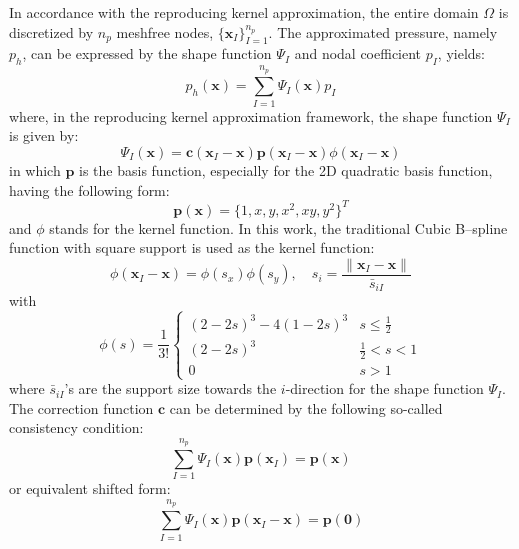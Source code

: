 In accordance with the reproducing kernel approximation, the entire domain $\Omega$ is discretized by $n_p$ meshfree nodes, $\{\boldsymbol{x}_I\}_{I=1}^{n_p}$. The approximated pressure, namely $p_h$, can be expressed by the shape function $\Psi_I$ and nodal coefficient $p_I$, yields:
\begin{equation}
p_h(\boldsymbol{x}) = \sum_{I=1}^{n_p} \Psi_I(\boldsymbol{x}) p_I
\end{equation}
where, in the reproducing kernel approximation framework, the shape function $\Psi_I$ is given by:
\begin{equation}\label{rkshape}
\Psi_I(\boldsymbol{x}) = \boldsymbol{c}(\boldsymbol{x}_I-\boldsymbol{x}) \boldsymbol{p}(\boldsymbol{x}_I-\boldsymbol{x}) \phi(\boldsymbol{x}_I - \boldsymbol{x})
\end{equation}
in which $\boldsymbol{p}$ is the basis function, especially for the 2D quadratic basis function, having the following form:
\begin{equation}
\boldsymbol{p}(\boldsymbol{x}) = \{ 1, x, y, x^2, xy, y^2\}^T
\end{equation}
and $\phi$ stands for the kernel function. In this work, the traditional Cubic B--spline function with square support is used as the kernel function:
\begin{equation}
\phi(\boldsymbol{x}_I-\boldsymbol{x}) = \phi(s_x) \phi(s_y), \quad s_i = \frac{\|\boldsymbol{x}_I - \boldsymbol{x}\|}{\bar{s}_{iI}}
\end{equation}
with
\begin{equation}
\phi(s) = \frac{1}{3!} \begin{cases}
(2-2s)^3 - 4(1-2s)^3 & s\le\frac{1}{2} \\
(2-2s)^3 &\frac{1}{2}<s<1 \\
0 & s> 1
\end{cases}
\end{equation}
where $\bar{s}_{iI}$'s are the support size towards the $i$-direction for the shape function $\Psi_I$. The correction function $\boldsymbol{c}$ can be determined by the following so-called consistency condition:
\begin{equation}\label{cc1}
\sum_{I=1}^{n_p} \Psi_I(\boldsymbol{x}) \boldsymbol{p}(\boldsymbol{x}_I) = \boldsymbol{p} (\boldsymbol{x})
\end{equation}
or equivalent shifted form:
\begin{equation}\label{cc2}
\sum_{I=1}^{n_p} \Psi_I(\boldsymbol{x}) \boldsymbol{p}(\boldsymbol{x}_I-\boldsymbol{x}) = \boldsymbol{p} (\boldsymbol{0})
\end{equation}
